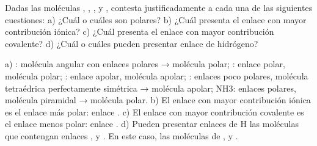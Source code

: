 \begin{exercise}
    Dadas las moléculas , , ,  y , contesta
    justificadamente a cada una de las siguientes cuestiones:
    a) ¿Cuál o cuáles son polares?
    b) ¿Cuál presenta el enlace con mayor contribución iónica?
    c) ¿Cuál presenta el enlace con mayor contribución covalente?
    d) ¿Cuál o cuáles pueden presentar enlace de hidrógeno?
    \begin{solu}
        a) : molécula angular con enlaces polares → molécula polar;
        : enlace polar, molécula polar; : enlace apolar, molécula
        apolar; : enlaces poco polares, molécula tetraédrica
        perfectamente simétrica → molécula apolar; NH3: enlaces
        polares, molécula piramidal → molécula polar.
        b) El enlace con mayor contribución iónica es el enlace más
        polar: enlace .
        c) El enlace con mayor contribución covalente es el enlace
        menos polar: enlace .
        d) Pueden presentar enlaces de H las moléculas que contengan
        enlaces ,  y . En este caso, las moléculas
        de ,  y .
    \end{solu}
\end{exercise}


